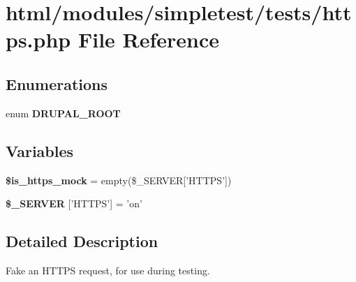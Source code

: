 \hypertarget{https_8php}{
\section{html/modules/simpletest/tests/https.php File Reference}
\label{https_8php}
}
\subsection*{Enumerations}
\begin{DoxyCompactItemize}
\item 
enum {\bfseries DRUPAL\_\-ROOT} 
\end{DoxyCompactItemize}
\subsection*{Variables}
\begin{DoxyCompactItemize}
\item 
\hypertarget{https_8php_aeec423f1e3106f3b1e3f0ff66e04ecbd}{
{\bfseries \$is\_\-https\_\-mock} = empty(\$\_\-SERVER\mbox{[}'HTTPS'\mbox{]})}
\label{https_8php_aeec423f1e3106f3b1e3f0ff66e04ecbd}

\item 
\hypertarget{https_8php_a9c01e1c18bc40c852b36b1392f45f0f4}{
{\bfseries \$\_\-SERVER} \mbox{[}'HTTPS'\mbox{]} = 'on'}
\label{https_8php_a9c01e1c18bc40c852b36b1392f45f0f4}

\end{DoxyCompactItemize}


\subsection{Detailed Description}
Fake an HTTPS request, for use during testing. 